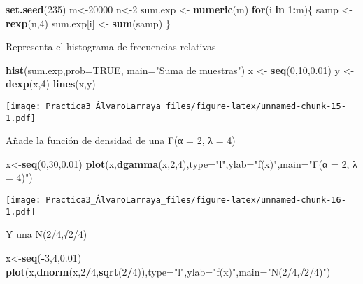 \documentclass[
]{article}
\newenvironment{Shaded}{\begin{snugshade}}{\end{snugshade}}
\newcommand{\ControlFlowTok}[1]{\textcolor[rgb]{0.13,0.29,0.53}{\textbf{#1}}}
\newcommand{\DataTypeTok}[1]{\textcolor[rgb]{0.13,0.29,0.53}{#1}}
\newcommand{\DecValTok}[1]{\textcolor[rgb]{0.00,0.00,0.81}{#1}}
\newcommand{\FloatTok}[1]{\textcolor[rgb]{0.00,0.00,0.81}{#1}}
\newcommand{\KeywordTok}[1]{\textcolor[rgb]{0.13,0.29,0.53}{\textbf{#1}}}
\newcommand{\NormalTok}[1]{#1}
\newcommand{\OperatorTok}[1]{\textcolor[rgb]{0.81,0.36,0.00}{\textbf{#1}}}
\newcommand{\OtherTok}[1]{\textcolor[rgb]{0.56,0.35,0.01}{#1}}
\newcommand{\StringTok}[1]{\textcolor[rgb]{0.31,0.60,0.02}{#1}}
\begin{document}
\begin{Shaded}
\begin{Highlighting}[]
\KeywordTok{set.seed}\NormalTok{(}\DecValTok{235}\NormalTok{)}
\NormalTok{m<-}\DecValTok{20000}
\NormalTok{n<-}\DecValTok{2}
\NormalTok{sum.exp <-}\StringTok{ }\KeywordTok{numeric}\NormalTok{(m)}
\ControlFlowTok{for}\NormalTok{(i }\ControlFlowTok{in} \DecValTok{1}\OperatorTok{:}\NormalTok{m)\{}
\NormalTok{samp <-}\StringTok{ }\KeywordTok{rexp}\NormalTok{(n,}\DecValTok{4}\NormalTok{)}
\NormalTok{sum.exp[i] <-}\StringTok{ }\KeywordTok{sum}\NormalTok{(samp)}
\NormalTok{\}}
\end{Highlighting}
\end{Shaded}

Representa el histograma de frecuencias relativas

\begin{Shaded}
\begin{Highlighting}[]
\KeywordTok{hist}\NormalTok{(sum.exp,}\DataTypeTok{prob=}\OtherTok{TRUE}\NormalTok{, }\DataTypeTok{main=}\StringTok{"Suma de muestras"}\NormalTok{)}
\NormalTok{x <-}\StringTok{ }\KeywordTok{seq}\NormalTok{(}\DecValTok{0}\NormalTok{,}\DecValTok{10}\NormalTok{,}\FloatTok{0.01}\NormalTok{)}
\NormalTok{y <-}\StringTok{ }\KeywordTok{dexp}\NormalTok{(x,}\DecValTok{4}\NormalTok{)}
\KeywordTok{lines}\NormalTok{(x,y)}
\end{Highlighting}
\end{Shaded}

\texttt{[image: Practica3\_ÁlvaroLarraya\_files/figure-latex/unnamed-chunk-15-1.pdf]}

Añade la función de densidad de una Γ(α = 2, λ = 4)

\begin{Shaded}
\begin{Highlighting}[]
\NormalTok{x<-}\KeywordTok{seq}\NormalTok{(}\DecValTok{0}\NormalTok{,}\DecValTok{30}\NormalTok{,}\FloatTok{0.01}\NormalTok{)}
\KeywordTok{plot}\NormalTok{(x,}\KeywordTok{dgamma}\NormalTok{(x,}\DecValTok{2}\NormalTok{,}\DecValTok{4}\NormalTok{),}\DataTypeTok{type=}\StringTok{"l"}\NormalTok{,}\DataTypeTok{ylab=}\StringTok{"f(x)"}\NormalTok{,}\DataTypeTok{main=}\StringTok{"Γ(α = 2, λ = 4)"}\NormalTok{)}
\end{Highlighting}
\end{Shaded}

\texttt{[image: Practica3\_ÁlvaroLarraya\_files/figure-latex/unnamed-chunk-16-1.pdf]}

Y una N(2/4,√2/4)

\begin{Shaded}
\begin{Highlighting}[]
\NormalTok{x<-}\KeywordTok{seq}\NormalTok{(}\OperatorTok{-}\DecValTok{3}\NormalTok{,}\DecValTok{4}\NormalTok{,}\FloatTok{0.01}\NormalTok{)}
\KeywordTok{plot}\NormalTok{(x,}\KeywordTok{dnorm}\NormalTok{(x,}\DecValTok{2}\OperatorTok{/}\DecValTok{4}\NormalTok{,}\KeywordTok{sqrt}\NormalTok{(}\DecValTok{2}\OperatorTok{/}\DecValTok{4}\NormalTok{)),}\DataTypeTok{type=}\StringTok{"l"}\NormalTok{,}\DataTypeTok{ylab=}\StringTok{"f(x)"}\NormalTok{,}\DataTypeTok{main=}\StringTok{"N(2/4,√2/4)"}\NormalTok{)}
\end{Highlighting}
\end{Shaded}
\end{document}
